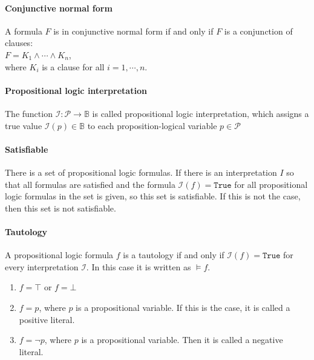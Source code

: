 
\paragraph{Conjunctive normal form} A formula $F$ is in conjunctive normal form if and only if $F$ is a conjunction of clauses:
\\[0.2cm]
\hspace*{1.3cm} $F = K_1 \land \cdots \land K_n$, \\[0.2cm]
where $K_i$ is a clause for all $i = 1, \cdots, n$.



\paragraph{Propositional logic interpretation}
The function $\mathcal{I}:\mathcal{P} \rightarrow \mathbb{B}$ is called propositional logic interpretation, which assigns a true value $\mathcal{I}(p) \in \mathbb{B}$ to each proposition-logical variable $p\in \mathcal{P}$

\paragraph{Satisfiable}
There is a set of propositional logic formulas. If there is an interpretation $I$ so that all formulas are satisfied and the formula $\mathcal{I}(f) = \texttt{True}$ for all propositional logic formulas in the set is given, so this set is satisfiable. If this is not the case, then this set is not satisfiable.


\paragraph{Tautology}
A propositional logic formula $f$ is a tautology if and only if $\mathcal{I}(f) = \texttt{True}$ for every interpretation $\mathcal{I}$. In this case it is written as $\models f$.

\begin{enumerate}
  \item $f = \top$ or $f = \bot$
  \item $f = p$, where $p$ is a propositional variable. If this is the case, it is called a positive literal.
  \item $f = \neg p$, where $p$ is a propositional variable. Then it is called a negative literal.
\end{enumerate}

